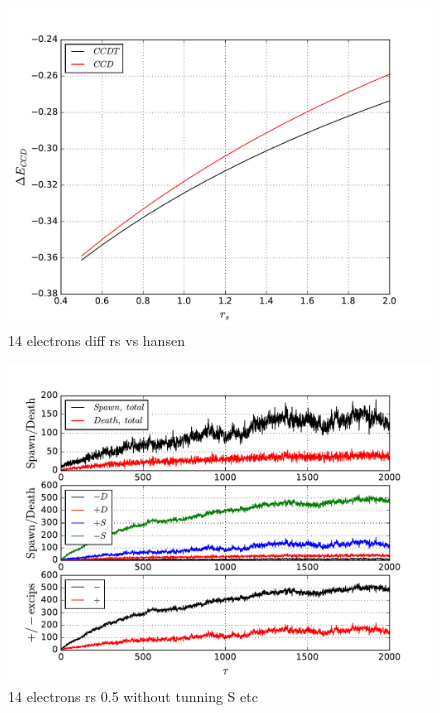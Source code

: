 \documentclass[twoside,english]{uiofysmaster}
\begin{document}
\begin{figure}[ht!]
	\centering
	\includegraphics[width=0.8\linewidth]{CCDvsCCDT}
	\caption{14 electrons diff rs vs hansen}
	\label{fig:CCDvsCCDT}
\end{figure}



\begin{landscape}

\begin{figure}[ht!]
	\centering
	\includegraphics[width=0.8\linewidth]{platFind}
	\caption{14 electrons rs 0.5 without tunning S etc }
	\label{fig:platFind}
\end{figure}

\end{landscape}
\end{document}
